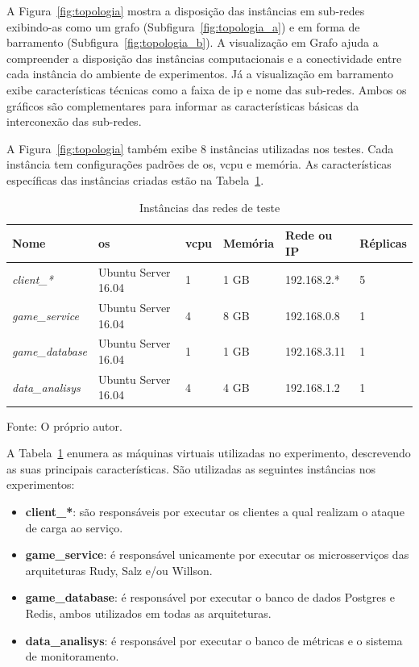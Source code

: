 A Figura~\ref{fig:topologia} mostra a disposição das instâncias em sub-redes exibindo-as como um grafo (Subfigura~\ref{fig:topologia_a}) e em forma de barramento (Subfigura~\ref{fig:topologia_b}).
%
A visualização em Grafo ajuda a compreender a disposição das instâncias computacionais e a conectividade entre cada instância do ambiente de experimentos.
%
Já a visualização em barramento exibe características técnicas como a faixa de \ac{ip} e nome das sub-redes.
%
Ambos os gráficos são complementares para informar as características básicas da interconexão das sub-redes.

A Figura~\ref{fig:topologia} também exibe 8 instâncias utilizadas nos testes.
%
Cada instância tem configurações padrões de \ac{os}, \acs{vcpu} e memória.
%
As características específicas das instâncias criadas estão na Tabela~\ref{tab:instancias}.

\begin{table}[htb!]
    \centering
    \caption{Instâncias das redes de teste}
    \label{tab:instancias}
    \begin{tabular}{|l|l|l|l|l|l|}
        \hline
        Nome                    & \ac{os}             &\acs{vcpu}& Memória & Rede ou IP   & Réplicas \\ \hline
        \textit{client\_*}      & Ubuntu Server 16.04 & 1        & 1 GB    & 192.168.2.*  & 5        \\ \hline
        \textit{game\_service}  & Ubuntu Server 16.04 & 4        & 8 GB    & 192.168.0.8  & 1        \\ \hline
        \textit{game\_database} & Ubuntu Server 16.04 & 1        & 1 GB    & 192.168.3.11 & 1        \\ \hline
        \textit{data\_analisys} & Ubuntu Server 16.04 & 4        & 4 GB    & 192.168.1.2  & 1        \\ \hline
    \end{tabular}

    Fonte: O próprio autor.
\end{table}

A Tabela~\ref{tab:instancias} enumera as máquinas virtuais utilizadas no experimento, descrevendo as suas principais características.
%
São utilizadas as seguintes instâncias nos experimentos:

\begin{itemize}
    \item \textbf{client\_*}: são responsáveis por executar os clientes a qual realizam o ataque de carga ao serviço.
    \item \textbf{game\_service}: é responsável unicamente por executar os microsserviços das arquiteturas Rudy, Salz e/ou Willson.
    \item \textbf{game\_database}: é responsável por executar o banco de dados Postgres e Redis, ambos utilizados em todas as arquiteturas.
    \item \textbf{data\_analisys}: é responsável por executar o banco de métricas e o sistema de monitoramento.
\end{itemize}

